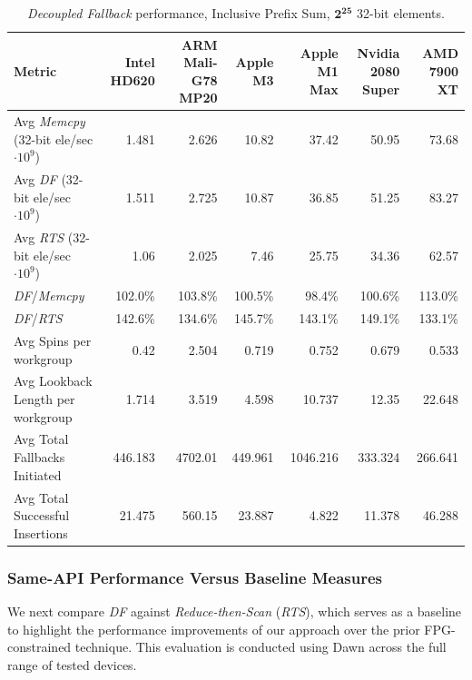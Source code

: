 \documentclass[sigconf,screen]{acmart}
\begin{document}
\begin{table}
  \centering
  \small
  \setlength{\tabcolsep}{1pt}
  \begin{tabular*}{\textwidth}{@{\extracolsep{\fill}} l r r r r r r}
    \toprule
    Metric & \!\!\!\!\!\!Intel HD620 & ARM Mali-G78 MP20 & Apple M3 & Apple M1 Max & Nvidia 2080 Super & AMD 7900 XT \\
    \midrule
    Avg \emph{Memcpy} (32-bit ele/sec $\cdot 10^9$) & 1.481   & 2.626   & 10.82   & 37.42    & 50.95   & 73.68   \\
    Avg \emph{DF} (32-bit ele/sec $\cdot 10^9$)     & 1.511   & 2.725   & 10.87   & 36.85    & 51.25   & 83.27   \\
    Avg \emph{RTS} (32-bit ele/sec $\cdot 10^9$)    & 1.06    & 2.025   & 7.46    & 25.75    & 34.36   & 62.57   \\
    \emph{DF}/\emph{Memcpy}                         & 102.0\% & 103.8\% & 100.5\% & 98.4\%   & 100.6\% & 113.0\% \\
    \emph{DF}/\emph{RTS}                            & 142.6\% & 134.6\% & 145.7\% & 143.1\%  & 149.1\% & 133.1\% \\
    Avg Spins per workgroup                         & 0.42    & 2.504   & 0.719   & 0.752    & 0.679   & 0.533   \\
    Avg Lookback Length per workgroup               & 1.714   & 3.519   & 4.598   & 10.737   & 12.35   & 22.648  \\
    Avg Total Fallbacks Initiated                   & 446.183 & 4702.01 & 449.961 & 1046.216 & 333.324 & 266.641 \\
    Avg Total Successful Insertions                 & 21.475  & 560.15  & 23.887  & 4.822    & 11.378  & 46.288  \\
    \bottomrule
  \end{tabular*}
  \caption{\emph{Decoupled Fallback} performance, Inclusive Prefix Sum, $\mathbf{2^{25}}$ 32-bit elements.\label{tab:results}}
\end{table}

\subsubsection{Same-API Performance Versus Baseline Measures}
\label{sec:SameVsBase}
We next compare \emph{DF} against \emph{Reduce-then-Scan} (\emph{RTS}), which serves as a baseline to highlight the performance improvements of our approach over the prior FPG-constrained technique. This evaluation is conducted using Dawn across the full range of tested devices.
\end{document}
